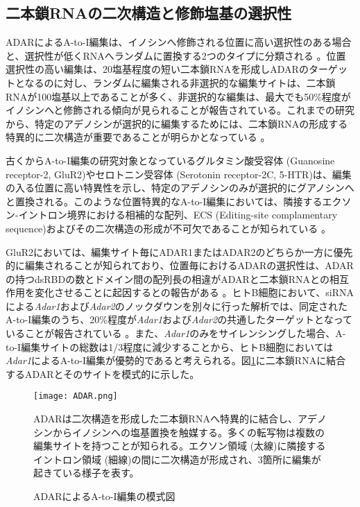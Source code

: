 \subsection{二本鎖RNAの二次構造と修飾塩基の選択性}
ADARによるA-to-I編集は、イノシンへ修飾される位置に高い選択性のある場合と、選択性が低くRNAへランダムに置換する2つのタイプに分類される \citep{Nis10}。位置選択性の高い編集は、20塩基程度の短い二本鎖RNAを形成しADARのターゲットとなるのに対し、ランダムに編集される非選択的な編集サイトは、二本鎖RNAが100塩基以上であることが多く、非選択的な編集は、最大でも50\%程度がイノシンへと修飾される傾向が見られることが報告されている。これまでの研究から、特定のアデノシンが選択的に編集するためには、二本鎖RNAの形成する特異的に二次構造が重要であることが明らかとなっている \citep{LehBas9908}。
\par
古くからA-to-I編集の研究対象となっているグルタミン酸受容体 (Guanosine receptor-2, GluR2)やセロトニン受容体 (Serotonin receptor-2C, 5-HTR)は、編集の入る位置に高い特異性を示し、特定のアデノシンのみが選択的にグアノシンへと置換される。このような位置特異的なA-to-I編集においては、隣接するエクソン-イントロン境界における相補的な配列、ECS (Editing-site complamentary sequence)およびその二次構造の形成が不可欠であることが知られている \citep{HigSinKoh9312}。
\par
GluR2においては、編集サイト毎にADAR1またはADAR2のどちらか一方に優先的に編集されることが知られており、位置毎におけるADARの選択性は、ADARの持つdsRBDの数とドメイン間の配列長の相違がADARと二本鎖RNAとの相互作用を変化させることに起因するとの報告がある \citep{Nishikura:2006aa}。ヒトB細胞において、siRNAによる\textit{Adar1}および\textit{Adar2}のノックダウンを別々に行った解析では、同定されたA-to-I編集のうち、20\%程度が\textit{Adar1}および\textit{Adar2}の共通したターゲットとなっていることが報告されている \citep{Wang:2013aa}。また、\textit{Adar1}のみをサイレンシングした場合、A-to-I編集サイトの総数は1/3程度に減少することから、ヒトB細胞においては\textit{Adar1}によるA-to-I編集が優勢的であると考えられる。図\ref{fig:ADAR}に二本鎖RNAに結合するADARとそのサイトを模式的に示した。

\begin{figure}[!h]
	\begin{center}
		\texttt{[image: ADAR.png]}
	\end{center}
	\caption{ADARによるA-to-I編集の模式図}
	\begin{flushleft}
		\small{ADARは二次構造を形成した二本鎖RNAへ特異的に結合し、アデノシンからイノシンへの塩基置換を触媒する。多くの転写物は複数の編集サイトを持つことが知られる。エクソン領域 (太線)に隣接するイントロン領域 (細線)の間に二次構造が形成され、3箇所に編集が起きている様子を表す。}
	\end{flushleft}
	\label{fig:ADAR}
\end{figure}

